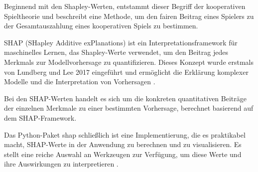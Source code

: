Beginnend mit den Shapley-Werten, entstammt dieser Begriff der kooperativen Spieltheorie und beschreibt eine Methode, 
um den fairen Beitrag eines Spielers zu der Gesamtauszahlung eines kooperativen Spiels zu bestimmen. 

SHAP (SHapley Additive exPlanations) ist ein Interpretationsframework für maschinelles Lernen, 
das Shapley-Werte verwendet, um den Beitrag jedes Merkmals zur Modellvorhersage 
zu quantifizieren. Dieses Konzept wurde erstmals von Lundberg und Lee 2017 eingeführt und 
ermöglicht die Erklärung komplexer Modelle und die Interpretation von Vorhersagen \cite[S. 1]{NIPS2017_8a20a862}.

Bei den SHAP-Werten handelt es sich um die konkreten quantitativen Beiträge der einzelnen Merkmale 
zu einer bestimmten Vorhersage, berechnet basierend auf dem SHAP-Framework.

Das Python-Paket \textsf{shap} schließlich ist eine Implementierung, die es praktikabel macht, SHAP-Werte in der Anwendung zu berechnen 
und zu visualisieren. Es stellt eine reiche Auswahl an Werkzeugen zur Verfügung, um diese Werte und ihre Auswirkungen zu interpretieren \cite[S. 14]{Molnar_2023}.



